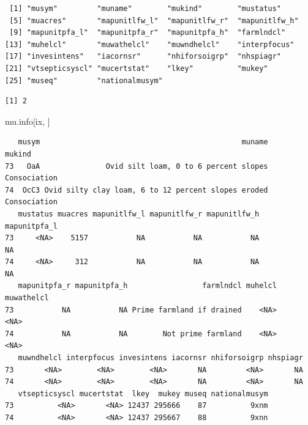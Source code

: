 \documentclass[
  letterpaper,
  DIV=11,
  numbers=noendperiod]{scrartcl}
\newenvironment{Shaded}{\begin{snugshade}}{\end{snugshade}}
\newcommand{\CommentTok}[1]{\textcolor[rgb]{0.37,0.37,0.37}{#1}}
\newcommand{\DecValTok}[1]{\textcolor[rgb]{0.68,0.00,0.00}{#1}}
\newcommand{\FunctionTok}[1]{\textcolor[rgb]{0.28,0.35,0.67}{#1}}
\newcommand{\NormalTok}[1]{\textcolor[rgb]{0.00,0.23,0.31}{#1}}
\newcommand{\OtherTok}[1]{\textcolor[rgb]{0.00,0.23,0.31}{#1}}
\newcommand{\SpecialCharTok}[1]{\textcolor[rgb]{0.37,0.37,0.37}{#1}}
\newcommand{\StringTok}[1]{\textcolor[rgb]{0.13,0.47,0.30}{#1}}
\begin{document}
\begin{verbatim}
 [1] "musym"         "muname"        "mukind"        "mustatus"     
 [5] "muacres"       "mapunitlfw_l"  "mapunitlfw_r"  "mapunitlfw_h" 
 [9] "mapunitpfa_l"  "mapunitpfa_r"  "mapunitpfa_h"  "farmlndcl"    
[13] "muhelcl"       "muwathelcl"    "muwndhelcl"    "interpfocus"  
[17] "invesintens"   "iacornsr"      "nhiforsoigrp"  "nhspiagr"     
[21] "vtsepticsyscl" "mucertstat"    "lkey"          "mukey"        
[25] "museq"         "nationalmusym"
\end{verbatim}

\begin{Shaded}
\end{Shaded}

\begin{verbatim}
[1] 2
\end{verbatim}

\begin{Shaded}
\begin{Highlighting}[]
\NormalTok{mu.info[ix, ]}
\end{Highlighting}
\end{Shaded}

\begin{verbatim}
   musym                                              muname       mukind
73   OaA               Ovid silt loam, 0 to 6 percent slopes Consociation
74  OcC3 Ovid silty clay loam, 6 to 12 percent slopes eroded Consociation
   mustatus muacres mapunitlfw_l mapunitlfw_r mapunitlfw_h mapunitpfa_l
73     <NA>    5157           NA           NA           NA           NA
74     <NA>     312           NA           NA           NA           NA
   mapunitpfa_r mapunitpfa_h                 farmlndcl muhelcl muwathelcl
73           NA           NA Prime farmland if drained    <NA>       <NA>
74           NA           NA        Not prime farmland    <NA>       <NA>
   muwndhelcl interpfocus invesintens iacornsr nhiforsoigrp nhspiagr
73       <NA>        <NA>        <NA>       NA         <NA>       NA
74       <NA>        <NA>        <NA>       NA         <NA>       NA
   vtsepticsyscl mucertstat  lkey  mukey museq nationalmusym
73          <NA>       <NA> 12437 295666    87          9xnm
74          <NA>       <NA> 12437 295667    88          9xnn
\end{verbatim}
\end{document}
